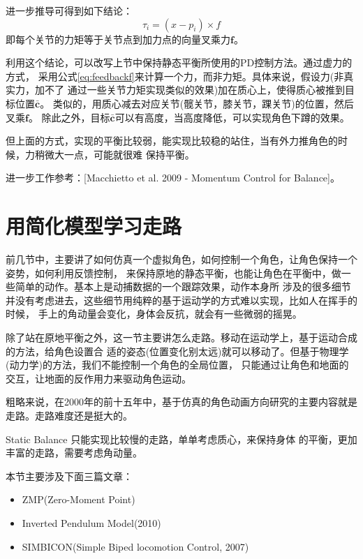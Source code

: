 \documentclass[lang=cn,newtx,10pt,scheme=chinese]{elegantbook}
\begin{document}
进一步推导可得到如下结论：
\begin{equation}
  \tau_i=\left(x-p_i\right) \times f
\end{equation}
即每个关节的力矩等于关节点到加力点的向量叉乘力$\boldsymbol{f}$。

利用这个结论，可以改写上节中保持静态平衡所使用的PD控制方法。通过虚力的方式，
采用公式\ref{eq:feedbackf}来计算一个力，而非力矩。具体来说，假设力(非真实力，加不了
通过一些关节力矩实现类似的效果)加在质心上，使得质心被推到目标位置$\bar{\boldsymbol{c}}$。
类似的，用质心减去对应关节(髋关节，膝关节，踝关节)的位置，然后叉乘$\boldsymbol{f}$。
除此之外，目标$\bar{\boldsymbol{c}}$可以有高度，当高度降低，可以实现角色下蹲的效果。

但上面的方式，实现的平衡比较弱，能实现比较稳的站住，当有外力推角色的时候，力稍微大一点，可能就很难
保持平衡。

进一步工作参考：[Macchietto et al. 2009 - Momentum Control for Balance]。

\section{用简化模型学习走路}
前几节中，主要讲了如何仿真一个虚拟角色，如何控制一个角色，让角色保持一个姿势，如何利用反馈控制，
来保持原地的静态平衡，也能让角色在平衡中，做一些简单的动作。基本上是动捕数据的一个跟踪效果，动作本身所
涉及的很多细节并没有考虑进去，这些细节用纯粹的基于运动学的方式难以实现，比如人在挥手的时候，
手上的角动量会变化，身体会反抗，就会有一些微弱的摇晃。

除了站在原地平衡之外，这一节主要讲怎么走路。移动在运动学上，基于运动合成的方法，给角色设置合
适的姿态(位置变化别太远)就可以移动了。但基于物理学(动力学)的方法，我们不能控制一个角色的全局位置，
只能通过让角色和地面的交互，让地面的反作用力来驱动角色运动。

粗略来说，在2000年的前十五年中，基于仿真的角色动画方向研究的主要内容就是走路。走路难度还是挺大的。

Static Balance 只能实现比较慢的走路，单单考虑质心，来保持身体
的平衡，更加丰富的走路，需要考虑角动量。

本节主要涉及下面三篇文章：
\begin{itemize}[itemindent=2em]
  \item ZMP(Zero-Moment Point)
  \item Inverted Pendulum Model(2010)
  \item SIMBICON(Simple Biped locomotion Control, 2007)
\end{itemize}
\end{document}
